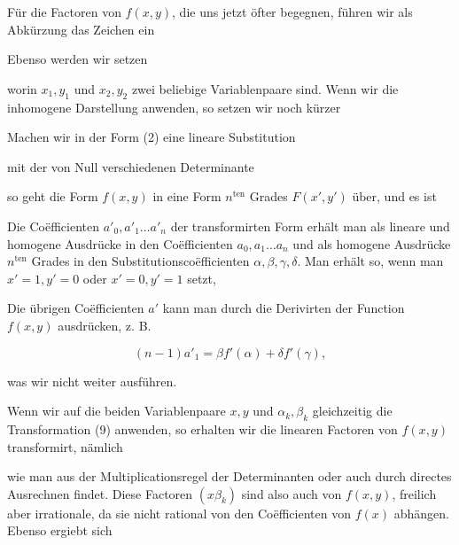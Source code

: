 
Für die Factoren von $f(x, y)$, die uns jetzt öfter begegnen, führen wir als Abkürzung das Zeichen ein


Ebenso werden wir setzen


worin $x_1, y_1$ und $x_2, y_2$ zwei beliebige Variablenpaare sind. Wenn wir die inhomogene Darstellung anwenden, so setzen wir noch kürzer


Machen wir in der Form (2) eine lineare Substitution


mit der von Null verschiedenen Determinante


so geht die Form $f(x, y)$ in eine Form $n^{\text{ten}}$ Grades $F(x', y')$ über, und es ist


Die Coëfficienten $a'_0, a'_1 \ldots a'_n$ der transformirten Form erhält man als lineare und homogene Ausdrücke in den Coëfficienten $a_0, a_1 \ldots a_n$ und als homogene Ausdrücke $n^{\text{ten}}$ Grades in den Substitutionscoëfficienten $\alpha, \beta, \gamma, \delta$. Man erhält so, wenn man $x' = 1, y' = 0$ oder $x' = 0, y' = 1$ setzt,


Die übrigen Coëfficienten $a'$ kann man durch die Derivirten der Function $f(x, y)$ ausdrücken, z. B.

\[
(n - 1) a'_1 = \beta f'(\alpha) + \delta f'(\gamma),
\]

was wir nicht weiter ausführen.

Wenn wir auf die beiden Variablenpaare $x, y$ und $\alpha_k, \beta_k$ gleichzeitig die Transformation (9) anwenden, so erhalten wir die linearen Factoren von $f(x, y)$ transformirt, nämlich


wie man aus der Multiplicationsregel der Determinanten oder auch durch directes Ausrechnen findet. Diese Factoren $(x\beta_k)$ sind also auch  von $f(x, y)$, freilich aber irrationale, da sie nicht rational von den Coëfficienten von $f(x)$ abhängen. Ebenso ergiebt sich
